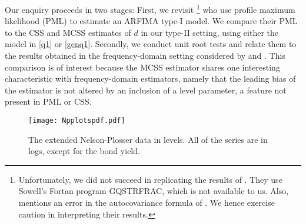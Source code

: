 {{Our enquiry proceeds in two stages: First, we revisit \textcite{crato1994fractional}\footnote{Unfortunately, we did not succeed in replicating the results of \textcite{crato1994fractional}. They use Sowell's Fortan program
  GQSTRFRAC, which is not available to us. Also, \textcite[p.\ 110]{hassler2019time} mentions an error in the autocovariance formula of \textcite[eq.\ (8)]{sowell1992modeling}. We hence exercise caution in interpreting their
  results.} who use profile maximum likelihood (PML) to estimate an ARFIMA type-I model. We compare their PML to the CSS and MCSS estimates of $d$ in our type-II setting, using either the model in \eqref{q1} or
\eqref{genq1}. Secondly, we conduct unit root tests and relate them to the results obtained in the frequency-domain setting considered by \textcite{gil1997testing} and \textcite{shimotsu2010exact}. This comparison is of interest
because the MCSS estimator shares one interesting characteristic with frequency-domain estimators, namely that the leading bias of the estimator is not altered by an inclusion of a level parameter, a feature not present in PML or
CSS.



\begin{figure}[H] 
\centering
\texttt{[image: Npplotspdf.pdf]}
\caption{ The extended Nelson-Plosser data in levels. All of the series are in logs, except for the bond yield.}
\label{fignp}
\end{figure} 





}}
